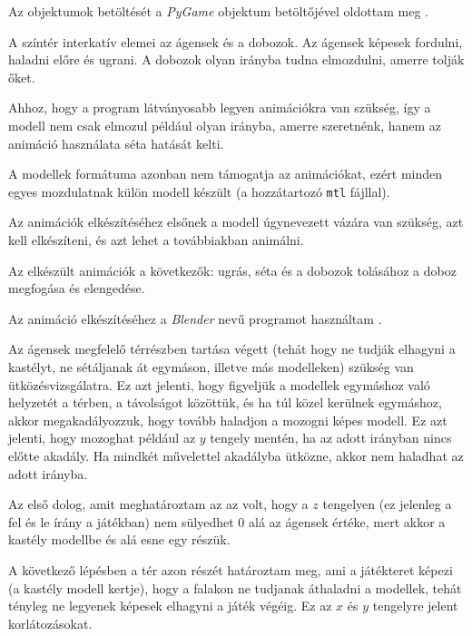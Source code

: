 Az objektumok betöltését a \textit{PyGame} objektum betöltőjével oldottam meg \cite{objloader}.


A színtér interkatív elemei az ágensek és a dobozok. 
Az ágensek képesek fordulni, haladni előre és ugrani. 
A dobozok olyan irányba tudna elmozdulni, amerre tolják őket.


Ahhoz, hogy a program látványosabb legyen animációkra van szükség, így a modell nem csak elmozul például olyan irányba, amerre szeretnénk, hanem az animáció használata séta hatását kelti.

A modellek formátuma azonban nem támogatja az animációkat, ezért minden egyes mozdulatnak külön modell készült (a hozzátartozó \texttt{mtl} fájllal).

Az animációk elkészítéséhez elsőnek a modell úgynevezett vázára van szükség, azt kell elkészíteni, és azt lehet a továbbiakban animálni. 
 
Az elkészült animációk a következők: ugrás, séta és a dobozok tolásához a doboz megfogása és elengedése.

Az animáció elkészítéséhez a \textit{Blender} nevű programot használtam \cite{blenderar}. 

 

Az ágensek megfelelő térrészben tartása végett (tehát hogy ne tudják elhagyni a kastélyt, ne sétáljanak át egymáson, illetve más modelleken) szükség van ütközésvizsgálatra.
Ez azt jelenti, hogy figyeljük a modellek egymáshoz való helyzetét a térben, a távolságot közöttük, és ha túl közel kerülnek egymáshoz, akkor megakadályozzuk, hogy tovább haladjon a mozogni képes modell.
Ez azt jelenti, hogy  mozoghat  például az $y$ tengely mentén, ha az adott irányban nincs előtte akadály.
Ha mindkét művelettel akadályba ütközne, akkor nem haladhat az adott irányba.
 
Az első dolog, amit meghatároztam az az volt, hogy a $z$ tengelyen (ez jelenleg a fel és le írány a játékban) nem sülyedhet 0 alá az ágensek értéke, mert akkor a kastély modellbe és alá esne egy részük.

A következő lépésben a tér azon részét határoztam meg, ami a játékteret képezi (a kastély modell kertje), hogy a falakon ne tudjanak áthaladni a modellek, tehát tényleg ne legyenek képesek elhagyni a játék végéig.
Ez az $x$ és $y$ tengelyre jelent korlátozásokat.

